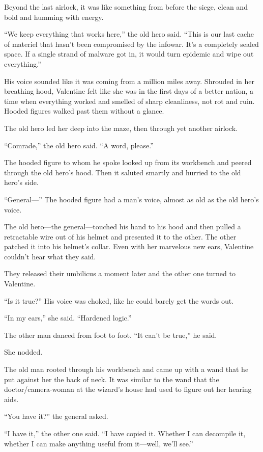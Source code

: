 Beyond the last airlock, it was like something from before the
siege, clean and bold and humming with energy.

“We keep everything that works here,” the old hero said. “This is
our last cache of materiel that hasn’t been compromised by the
infowar. It’s a completely sealed space. If a single strand of
malware got in, it would turn epidemic and wipe out everything.”

His voice sounded like it was coming from a million miles away.
Shrouded in her breathing hood, Valentine felt like she was in the
first days of a better nation, a time when everything worked and
smelled of sharp cleanliness, not rot and ruin. Hooded figures
walked past them without a glance.

The old hero led her deep into the maze, then through yet another
airlock.

“Comrade,” the old hero said. “A word, please.”

The hooded figure to whom he spoke looked up from its workbench and
peered through the old hero’s hood. Then it saluted smartly and
hurried to the old hero’s side.

“General—” The hooded figure had a man’s voice, almost as old as
the old hero’s voice.

The old hero—the general—touched his hand to his hood and then
pulled a retractable wire out of his helmet and presented it to the
other. The other patched it into his helmet’s collar. Even with her
marvelous new ears, Valentine couldn’t hear what they said.

They released their umbilicus a moment later and the other one
turned to Valentine.

“Is it true?” His voice was choked, like he could barely get the
words out.

“In my ears,” she said. “Hardened logic.”

The other man danced from foot to foot. “It can’t be true,” he
said.

She nodded.

The old man rooted through his workbench and came up with a wand
that he put against her the back of neck. It was similar to the
wand that the doctor/camera-woman at the wizard’s house had used to
figure out her hearing aids.

“You have it?” the general asked.

“I have it,” the other one said. “I have copied it. Whether I can
decompile it, whether I can make anything useful from it—well,
we’ll see.”

